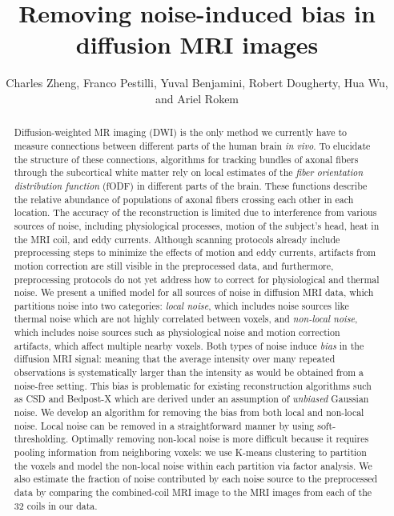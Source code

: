 \documentclass[11pt]{article}
\begin{document}
\newcommand{\tr}{\text{tr}}
\newcommand{\E}{\textbf{E}}
\newcommand{\diag}{\text{diag}}
\newcommand{\argmax}{\text{argmax}}
\newcommand{\argmin}{\text{argmin}}
\newcommand{\Cov}{\text{Cov}}
\newcommand{\Vol}{\text{Vol}}
\pagestyle{fancy}

\title{Removing noise-induced bias in diffusion MRI images}

\author{Charles Zheng, Franco Pestilli, Yuval Benjamini, Robert Dougherty, Hua Wu, and Ariel Rokem}

\maketitle

\begin{abstract}
Diffusion-weighted MR imaging (DWI) is the only method we currently
have to measure connections between different parts of the human brain
\emph{in vivo}.  To elucidate the structure of these connections,
algorithms for tracking bundles of axonal fibers through the
subcortical white matter rely on local estimates of the \emph{fiber
  orientation distribution function} (fODF) in different parts of the
brain. These functions describe the relative abundance of populations
of axonal fibers crossing each other in each location.  The accuracy
of the reconstruction is limited due to interference from various
sources of noise, including physiological processes, motion of the
subject's head, heat in the MRI coil, and eddy currents.  Although
scanning protocols already include preprocessing steps to minimize the
effects of motion and eddy currents, artifacts from motion correction
are still visible in the preprocessed data, and furthermore,
preprocessing protocols do not yet address how to correct for
physiological and thermal noise.  We present a unified model for all
sources of noise in diffusion MRI data, which partitions noise into
two categories: \emph{local noise}, which includes noise sources like
thermal noise which are not highly correlated between voxels, and
\emph{non-local noise}, which includes noise sources such as
physiological noise and motion correction artifacts, which affect
multiple nearby voxels.  Both types of noise induce \emph{bias} in the
diffusion MRI signal: meaning that the average intensity over many
repeated observations is systematically larger than the intensity as
would be obtained from a noise-free setting.  This bias is problematic
for existing reconstruction algorithms such as CSD and Bedpost-X which
are derived under an assumption of \emph{unbiased} Gaussian noise.  We
develop an algorithm for removing the bias from both local and
non-local noise. Local noise can be removed in a straightforward
manner by using soft-thresholding. Optimally removing non-local noise
is more difficult because it requires pooling information from
neighboring voxels: we use K-means clustering to partition the voxels
and model the non-local noise within each partition via factor
analysis.  We also estimate the fraction of noise contributed by each
noise source to the preprocessed data by comparing the combined-coil
MRI image to the MRI images from each of the 32 coils in our data.
\end{abstract}
\end{document}
